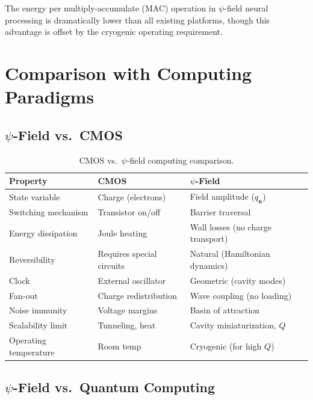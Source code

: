 \documentclass[12pt,a4paper,twoside]{article}
\begin{document}
The energy per multiply-accumulate (MAC) operation in $\psi$-field neural processing is dramatically lower than all existing platforms, though this advantage is offset by the cryogenic operating requirement.

\section{Comparison with Computing Paradigms}\label{sec:comparison}

\subsection{$\psi$-Field vs.\ CMOS}\label{sec:vs_cmos}

\begin{table}[H]
\centering
\caption{CMOS vs.\ $\psi$-field computing comparison.}
\label{tab:vs_cmos}
\begin{tabular}{lll}
\toprule
\textbf{Property} & \textbf{CMOS} & \textbf{$\psi$-Field} \\
\midrule
State variable & Charge (electrons) & Field amplitude ($q_{\mathbf{n}}$) \\
Switching mechanism & Transistor on/off & Barrier traversal \\
Energy dissipation & Joule heating & Wall losses (no charge transport) \\
Reversibility & Requires special circuits & Natural (Hamiltonian dynamics) \\
Clock & External oscillator & Geometric (cavity modes) \\
Fan-out & Charge redistribution & Wave coupling (no loading) \\
Noise immunity & Voltage margins & Basin of attraction \\
Scalability limit & Tunneling, heat & Cavity miniaturization, $Q$ \\
Operating temperature & Room temp & Cryogenic (for high $Q$) \\
\bottomrule
\end{tabular}
\end{table}

\subsection{$\psi$-Field vs.\ Quantum Computing}\label{sec:vs_quantum}
\end{document}
